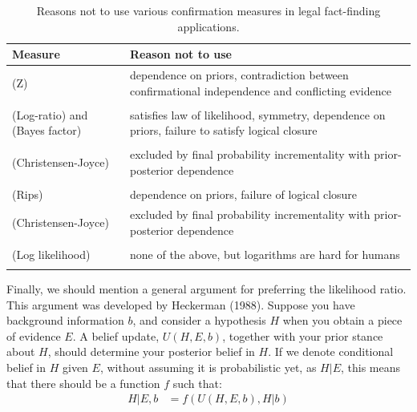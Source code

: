 \documentclass[
  10pt,
  dvipsnames,enabledeprecatedfontcommands]{scrartcl}
\begin{document}
\begin{table}
\centering\begingroup\fontsize{9}{11}\selectfont

\begin{tabular}{lp{10cm}}
\toprule
Measure & Reason not to use\\
\midrule
(Z) & dependence on priors, contradiction between confirmational independence and  conflicting evidence\\
\cellcolor{gray!6}{(Difference)} & \cellcolor{gray!6}{dependence on priors, logical closure failure}\\
(Log-ratio) and (Bayes factor) & satisfies law of likelihood, symmetry, dependence on priors, failure to satisfy logical closure\\
\cellcolor{gray!6}{(Generalized entailment)} & \cellcolor{gray!6}{dependence on priors, independent conflicting evidence}\\
(Christensen-Joyce) & excluded by final probability incrementality with prior-posterior dependence\\
\cellcolor{gray!6}{(Carnap)} & \cellcolor{gray!6}{excluded by final probability incrementality with prior-posterior dependence, symmetry, logical closure failure}\\
(Rips) & dependence on priors, failure of logical closure\\
(Christensen-Joyce) & excluded by final probability incrementality with prior-posterior dependence\\
\cellcolor{gray!6}{(Kemeny-Oppenheim)} & \cellcolor{gray!6}{none of the above, but unnecessarily complex}\\
(Log likelihood) & none of the above, but logarithms are hard for humans\\
\cellcolor{gray!6}{(Likelihood ratio)} & \cellcolor{gray!6}{none of the above}\\
\bottomrule
\end{tabular}
\endgroup{}
\caption{Reasons not to use various confirmation measures in legal fact-finding applications.}
\label{tab:confirmation}
\end{table}

Finally, we should mention a general argument for preferring the
likelihood ratio. This argument was developed by Heckerman (1988).
Suppose you have background information \(b\), and consider a hypothesis
\(H\) when you obtain a piece of evidence \(E\). A belief update,
\(U(H, E, b)\), together with your prior stance about \(H\), should
determine your posterior belief in \(H\). If we denote conditional
belief in \(H\) given \(E\), without assuming it is probabilistic yet,
as \(H\vert E\), this means that there should be a function \(f\) such
that: \begin{align*}
H \vert E, b & = f(U(H,E,b), H \vert b)
\end{align*}
\end{document}
